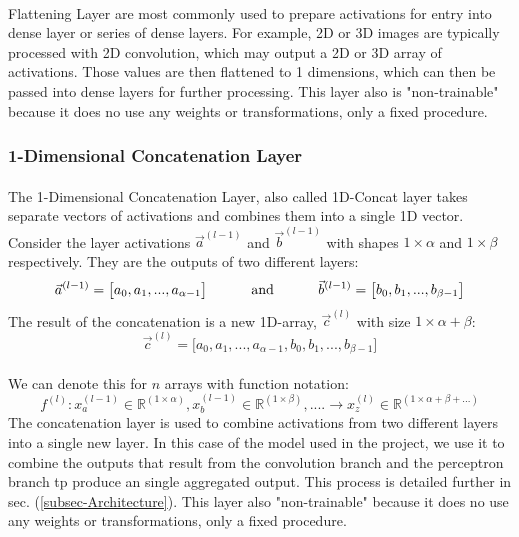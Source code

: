 \documentclass[12pt,letterpaper]{article}
\begin{document}
\paragraph*{}Flattening Layer are most commonly used to prepare activations for entry into dense layer or series of dense layers. For example, 2D or 3D images are typically processed with 2D convolution, which may output a 2D or 3D array of activations. Those values are then flattened to 1 dimensions, which can then be passed into dense layers for further processing. This layer also is "non-trainable" because it does no use any weights or transformations, only a fixed procedure.


\subsubsection{1-Dimensional Concatenation Layer}
\label{subsubsec-1DConcat}

\paragraph*{}The 1-Dimensional Concatenation Layer, also called 1D-Concat layer takes separate vectors of activations and combines them into a single 1D vector. Consider the layer activations $\vec{a}^{(l-1)}$ and $\vec{b}^{(l-1)}$ with shapes  $1 \times \alpha$ and $1 \times \beta$ respectively. They are the outputs of two different layers:
\begin{equation}
\vec{a}^{(l-1)} = \big[ a_{0},  a_{1}, ... ,  a_{\alpha-1} \big]
\text{\hspace{1cm} and \hspace{1cm}}
\vec{b}^{(l-1)} = \big[ b_{0},  b_{1}, ... ,  b_{\beta-1} \big]
\end{equation}
The result of the concatenation is a new 1D-array, $\vec{c}^{(l)}$ with size $1 \times \alpha + \beta$:
\begin{equation}
\vec{c}^{(l)} = \big[ a_{0},  a_{1}, ... ,  a_{\alpha-1}, b_{0},  b_{1}, ... ,  b_{\beta-1} \big]
\end{equation}

\paragraph*{}We can denote this for $n$ arrays with function notation:
\begin{equation}
\label{eqn-ConcatenationFunction}
f^{(l)} : x^{(l-1)}_{a} \in \mathbb{R}^{(1 \times \alpha)} , x^{(l-1)}_{b} \in \mathbb{R}^{(1 \times \beta)} , ....  \rightarrow
x^{(l)}_{z} \in \mathbb{R}^{(1 \times \alpha + \beta + ...)}
\end{equation}
The concatenation layer is used to combine activations from two different layers into a single new layer. In this case of the model used in the project, we use it to combine the outputs that result from the convolution branch and the perceptron branch tp produce an single aggregated output. This process is detailed further in sec. (\ref{subsec-Architecture}). This layer also "non-trainable" because it does no use any weights or transformations, only a fixed procedure.
\end{document}
